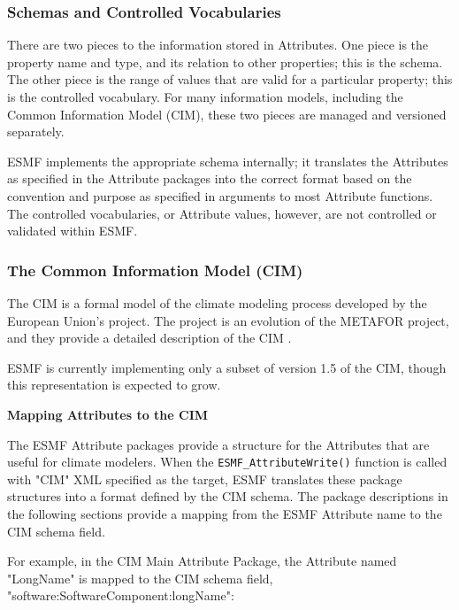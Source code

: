 \subsubsection{Schemas and Controlled Vocabularies}

There are two pieces to the information stored in Attributes.  One piece
is the property name and type, and its relation to other properties; this
is the schema.  The other piece is the range of values that are valid for
a particular property; this is the controlled vocabulary.  For many
information models, including the Common Information Model (CIM), these two
pieces are managed and versioned separately.

ESMF implements the appropriate schema internally; it translates the Attributes
as specified in the Attribute packages into the correct format based on the
convention and purpose as specified in arguments to most Attribute functions.
The controlled vocabularies, or Attribute values, however, are not controlled
or validated within ESMF.

\subsubsection{The Common Information Model (CIM)}

The CIM is a formal model of the climate modeling process developed by
the European Union's 
project.  The  project
is an evolution of the METAFOR project, and they provide a detailed
description of the CIM .

ESMF is currently implementing only a subset of version 1.5 of the CIM, though this representation is expected to grow.

{\bf Mapping Attributes to the CIM}

The ESMF Attribute packages provide a structure for the Attributes that
are useful for climate modelers.  When the {\tt ESMF\_AttributeWrite()}
function is
called with "CIM" XML specified as the target, ESMF translates these package
structures into a format defined by the CIM schema.  The package descriptions
in the following sections provide a mapping from the ESMF Attribute name
to the CIM schema field.

For example, in the CIM Main Attribute Package, the Attribute named
"LongName" is mapped to the CIM schema field,
"software:SoftwareComponent:longName":

